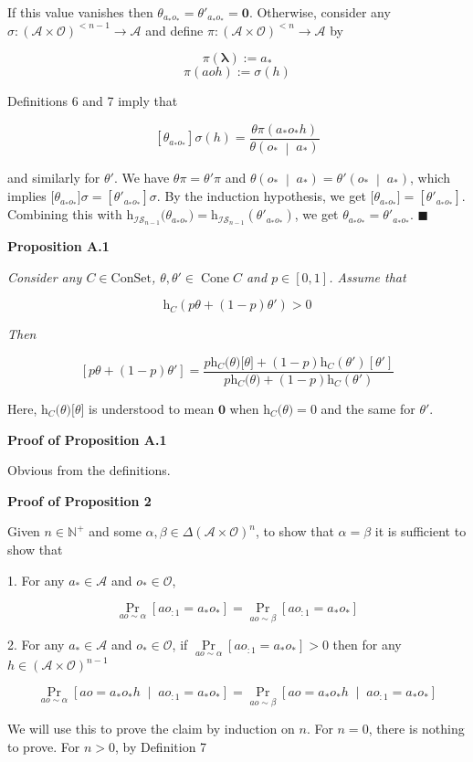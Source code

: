 \documentclass[a4paper]{article}
\newcommand{\Co}[1]{}
\newcommand{\AP}[1]{\left(#1\right)}
\newcommand{\AB}[1]{\left[#1\right]}
\newcommand{\APM}[2]{\left(#1\;\middle\vert\;#2\right)}
\newcommand{\ABM}[2]{\left[#1\;\middle\vert\;#2\right]}
\newcommand{\Pa}[2]{\underset{#1}{\operatorname{Pr}}\AB{#2}}
\newcommand{\CP}[3]{\underset{#1}{\operatorname{Pr}}\ABM{#2}{#3}}
\newcommand{\Nats}{\mathbb{N}}
\newcommand{\Estr}{\boldsymbol{\lambda}} %
\newcommand{\A}{\mathcal{A}}
\newcommand{\Ob}{\mathcal{O}}
\newcommand{\AO}{\AP{\A\times\Ob}}
\newcommand{\Con}{{\boldsymbol{\mathrm{ConSet}}}}
\DeclareMathOperator{\Cone}{Cone}
\newcommand{\Ht}{\mathrm{h}}
\newcommand{\IS}{\mathcal{IS}}
\begin{document}
If this value vanishes then $\theta_{a_*o_*}=\theta'_{a_*o_*}=\boldsymbol{0}$. Otherwise, consider any $\sigma:\AO^{<n-1}\rightarrow\A$ and define $\pi:\AO^{<n}\rightarrow\A$ by

$$\pi(\Estr):=a_*$$
$$\pi(aoh):=\sigma(h)$$

Definitions 6 and 7 imply that

$$\AB{\theta_{a_*o_*}}\sigma(h)=\frac{\theta\pi(a_*o_*h)}{\theta\APM{o_*}{a_*}}$$

and similarly for $\theta'$. We have $\theta\pi=\theta'\pi$ and $\theta\APM{o_*}{a_*}=\theta'\APM{o_*}{a_*}$, which implies $\Big[\theta_{a_*o_*}\Big]\sigma=\AB{\theta'_{a_*o_*}}\sigma$. By the induction hypothesis, we get $\big[\theta_{a_*o_*}\big]=\AB{\theta'_{a_*o_*}}$. Combining this with $\Ht_{\IS_{n-1}}\big(\theta_{a_*o_*}\big)=\Ht_{\IS_{n-1}}\AP{\theta'_{a_*o_*}}$, we get $\theta_{a_*o_*}=\theta'_{a_*o_*}$. $\blacksquare$

\textbf{Proposition A.1}\Co{b}

\textit{Consider any $C\in\Con$, $\theta,\theta'\in\Cone{C}$ and $p\in[0,1]$. Assume that}\Co{i} 

$$\Ht_C\AP{p\theta+(1-p)\theta'}>0$$

\textit{Then}\Co{i}

$$\AB{p\theta+(1-p)\theta'}=\frac{p\Ht_C\big(\theta\big)\big[\theta\big]+(1-p)\Ht_C\AP{\theta'}\AB{\theta'}}{p\Ht_C\big(\theta\big)+(1-p)\Ht_C\AP{\theta'}}$$

Here, $\Ht_C\big(\theta\big)\big[\theta\big]$ is understood to mean $\boldsymbol{0}$ when $\Ht_C\big(\theta\big)=0$ and the same for $\theta'$.

\textbf{Proof of Proposition A.1}\Co{b}

Obvious from the definitions.

\textbf{Proof of Proposition 2}\Co{b}

Given $n\in\Nats^+$ and some $\alpha,\beta\in\Delta\AO^n$, to show that $\alpha=\beta$ it is sufficient to show that

1. For any $a_*\in\A$ and $o_*\in\Ob$, 

$$\Pa{ao\sim\alpha}{ao_{:1}=a_*o_*}=\Pa{ao\sim\beta}{ao_{:1}=a_*o_*}$$

2. For any $a_*\in\A$ and $o_*\in\Ob$, if $\Pa{ao\sim\alpha}{ao_{:1}=a_*o_*}>0$ then for any $h\in\AO^{n-1}$

$$\CP{ao\sim\alpha}{ao=a_*o_*h}{ao_{:1}=a_*o_*}=\CP{ao\sim\beta}{ao=a_*o_*h}{ao_{:1}=a_*o_*}$$

We will use this to prove the claim by induction on $n$. For $n=0$, there is nothing to prove. For $n>0$, by Definition 7
\end{document}
